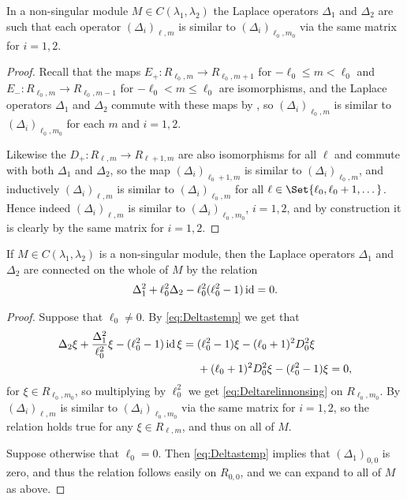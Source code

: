 \begin{lemma}\label{lem:nonsingsimilar}
  In a non-singular module $M\in C(\lambda_1,\lambda _2)$ the Laplace operators $\Delta_1$ and $\Delta_2$ are such that each operator $(\Delta_i)_{\ell,m}$ is similar to $(\Delta_i)_{\ell_0,m_0}$ via the same matrix for $i=1,2$. 
\end{lemma}
\begin{proof}
  Recall that the maps $E_+\colon R_{\ell_0,m} \to R_{\ell_0,m+1}$ for $-\ell_0\leq m<\ell_0$ and $E_-\colon R_{\ell_0,m} \to R_{\ell_0,m-1}$ for $-\ell_0<m\leq \ell_0$ are isomorphisms, and the Laplace operators $\Delta_1$ and $\Delta_2$ commute with these maps by , so $(\Delta_i)_{\ell_0,m}$ is similar to $(\Delta_i)_{\ell_0,m_0}$ for each $m$ and $i=1,2$.

  Likewise the $D_+\colon R_{\ell,m}\to R_{\ell+1,m}$ are also isomorphisms for all $\ell$ and commute with both $\Delta_1$ and $\Delta_2$, so the map $(\Delta_i)_{\ell_0+1,m}$ is similar to $(\Delta_i)_{\ell_0,m}$, and inductively $(\Delta_i)_{\ell,m}$ is similar to $(\Delta_i)_{\ell_0,m}$ for all $\ell\in \Set{\ell_0,\ell_0+1,\dotsc}$. Hence indeed $(\Delta_i)_{\ell,m}$ is similar to $(\Delta_i)_{\ell_0,m_0}$, $i=1,2$, and by construction it is clearly by the same matrix for $i=1,2$.
\end{proof}

\begin{lemma}\label{lem:Deltarelnonsing}
  If $M\in C(\lambda_1,\lambda_2)$ is a non-singular module, then the Laplace operators $\Delta_1$ and $\Delta_2$ are connected on the whole of $M$ by the relation
  \begin{align}\label{eq:Deltarelinnonsing}
    \Delta_1^2 + \ell_0^2\Delta_2 - \ell_0^2(\ell_0^2-1)\operatorname{id} = 0.
  \end{align}
\end{lemma}
\begin{proof}
  Suppose that $\ell_0\neq 0$. By \cref{eq:Deltastemp} we get that
  \begin{align}\label{eq:deltatempcalc}
    \begin{aligned}
      \Delta_2 \xi + \dfrac{\Delta_1^2}{\ell_0^2}\xi - (\ell_0^2-1)\id \xi &= (\ell_0^2-1)\xi - (\ell_0+1)^2D_0^2\xi \\*
      &\phantom{{}={}}{} + (\ell_0+1)^2D_0^2\xi - (\ell_0^2-1)\xi = 0,
    \end{aligned}
  \end{align}
  for $\xi\in R_{\ell_0,m_0}$, so multiplying by $\ell_0^2$ we get \cref{eq:Deltarelinnonsing} on $R_{\ell_0,m_0}$. By  $(\Delta_i)_{\ell,m}$ is similar to $(\Delta_i)_{\ell_0,m_0}$ via the same matrix for $i=1,2$, so the relation holds true for any $\xi\in R_{\ell,m}$, and thus on all of $M$.

  Suppose otherwise that $\ell_0=0$. Then \cref{eq:Deltastemp} implies that $(\Delta_1)_{0,0}$ is zero, and thus the relation follows easily on $R_{0,0}$, and we can expand to all of $M$ as above.
\end{proof}

